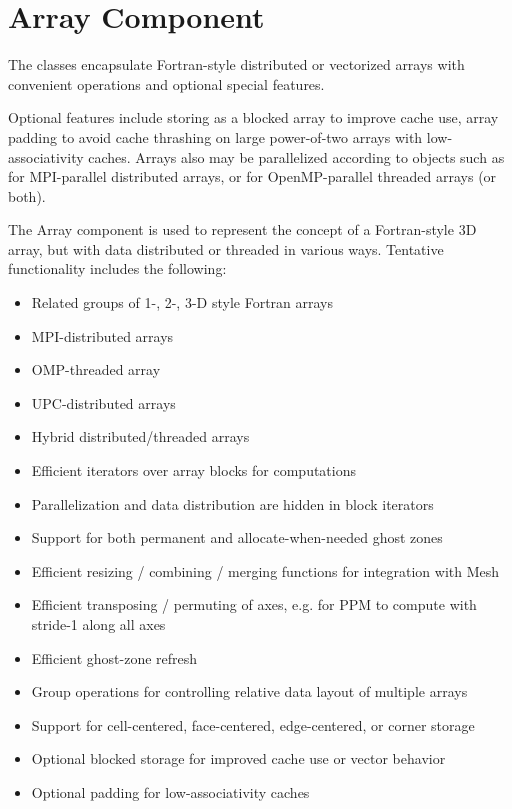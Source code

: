 \section{Array Component} \label{s:component-array}

The  classes encapsulate Fortran-style distributed or
vectorized arrays with convenient operations and optional special
features.

Optional features include storing as a blocked array to improve cache
use, array padding to avoid cache thrashing on large power-of-two
arrays with low-associativity caches.  Arrays also may be parallelized
according to  objects such as
 for MPI-parallel distributed arrays, or
 for OpenMP-parallel threaded arrays (or both).

The Array component is used to represent the concept of a
Fortran-style 3D array, but with data distributed or threaded in
various ways. Tentative functionality includes the following:

\begin{itemize}
\item Related groups of 1-, 2-, 3-D style Fortran arrays
\item MPI-distributed arrays
\item OMP-threaded array
\item UPC-distributed arrays
\item Hybrid distributed/threaded arrays
\item Efficient iterators over array blocks for computations
\item Parallelization and data distribution are hidden in block
  iterators
\item Support for both permanent and allocate-when-needed ghost zones
\item Efficient resizing / combining / merging functions for
  integration with Mesh
\item Efficient transposing / permuting of axes, e.g. for PPM to
  compute with stride-1 along all axes
\item Efficient ghost-zone refresh
\item Group operations for controlling relative data layout of
  multiple arrays
\item Support for cell-centered, face-centered, edge-centered, or
  corner storage
\item Optional blocked storage for improved cache use or vector
  behavior
\item Optional padding for low-associativity caches
\end{itemize}

